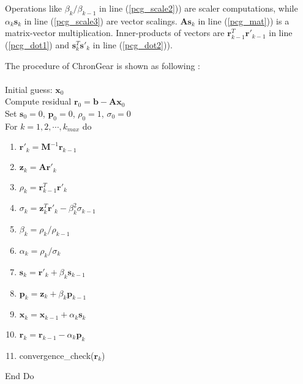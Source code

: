 Operations like  $\beta_k/\beta_{k-1}$ in line (\ref{pcg_scale2})) are scaler computations,  while $\alpha_k \textbf{s}_k$ in line (\ref{pcg_scale3}) are vector scalings.
$\textbf{A}\textbf{s}_k$ in line (\ref{pcg_mat})) is a matrix-vector multiplication.
Inner-products of vectors are  $\textbf{r}_{k-1}^T\textbf{r}'_{k-1}$ in line (\ref{pcg_dot1}) and $\textbf{s}_k^T\textbf{s}'_k$  in line (\ref{pcg_dot2})).


The procedure of ChronGear is shown as following : \\
 \space \\
Initial guess: $\textbf{x}_0$  \\
Compute residual $\textbf{r}_0 = \textbf{b}- {\textbf{A}}\textbf{x}_0$ \\
Set $\textbf{s}_0 =0$, $\textbf{p}_0 =0$, $\rho_0=1$, $\sigma_0=0$ \\
For $k = 1, 2, \cdots,  k_{max}$  do
\begin{enumerate}
\item $\textbf{r}'_{k} =\textbf{M}^{-1}\textbf{r}_{k-1} $  \label{cg_scale0}
\item $\textbf{z}_k = \textbf{A}\textbf{r}'_{k}$  \label{cg_mat}
\item $\rho_k = \textbf{r}_{k-1}^T\textbf{r}'_{k}$\label{cg_dot1}
\item $\sigma_k = \textbf{z}_k^T\textbf{r}'_k - \beta_k^2\sigma_{k-1}$\label{cg_sigma}
\item $\beta_k = \rho_k / \rho_{k-1}$\label{cg_beta}
\item $\alpha_k = \rho_k /\sigma_{k}$\label{cg_alpha}
\item $\textbf{s}_k = \textbf{r}'_{k} +\beta_k\textbf{s}_{k-1}$\label{cg_scale1}
\item $\textbf{p}_k = \textbf{z}_{k} +\beta_k\textbf{p}_{k-1}$\label{cg_scale2}
\item $\textbf{x}_k =\textbf{x}_{k-1} +\alpha_k \textbf{s}_k$\label{cg_scale3}
\item $\textbf{r}_k =\textbf{r}_{k-1} -\alpha_k\textbf{p}_k$
\item convergence\_check($\textbf{r}_{k}$)
\end{enumerate}
End Do \\


